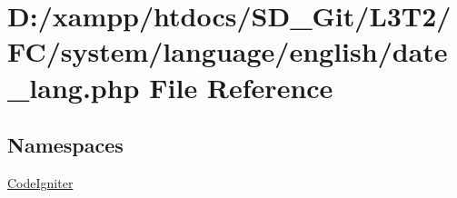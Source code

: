 \hypertarget{date__lang_8php}{}\section{D\+:/xampp/htdocs/\+S\+D\+\_\+\+Git/\+L3\+T2/\+F\+C/system/language/english/date\+\_\+lang.php File Reference}
\label{date__lang_8php}
\subsection*{Namespaces}
\begin{DoxyCompactItemize}
\item 
 \hyperlink{namespace_code_igniter}{Code\+Igniter}
\end{DoxyCompactItemize}
